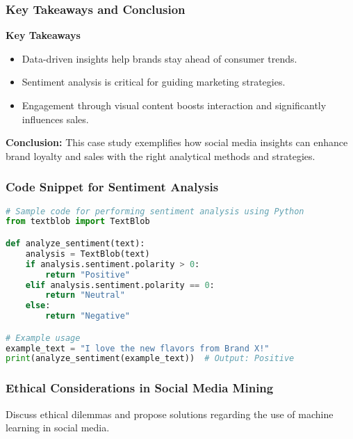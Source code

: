 \documentclass{beamer}
\begin{document}
\begin{frame}[fragile]
    \frametitle{Key Takeaways and Conclusion}
    \textbf{Key Takeaways}
    \begin{itemize}
        \item Data-driven insights help brands stay ahead of consumer trends.
        \item Sentiment analysis is critical for guiding marketing strategies.
        \item Engagement through visual content boosts interaction and significantly influences sales.
    \end{itemize}

    \textbf{Conclusion:}
    This case study exemplifies how social media insights can enhance brand loyalty and sales with the right analytical methods and strategies.
\end{frame}

\begin{frame}[fragile]
    \frametitle{Code Snippet for Sentiment Analysis}
    \begin{lstlisting}[language=Python]
# Sample code for performing sentiment analysis using Python
from textblob import TextBlob

def analyze_sentiment(text):
    analysis = TextBlob(text)
    if analysis.sentiment.polarity > 0:
        return "Positive"
    elif analysis.sentiment.polarity == 0:
        return "Neutral"
    else:
        return "Negative"

# Example usage
example_text = "I love the new flavors from Brand X!"
print(analyze_sentiment(example_text))  # Output: Positive
    \end{lstlisting}
\end{frame}

\begin{frame}[fragile]
    \frametitle{Ethical Considerations in Social Media Mining}
    Discuss ethical dilemmas and propose solutions regarding the use of machine learning in social media.
\end{frame}
\end{document}
